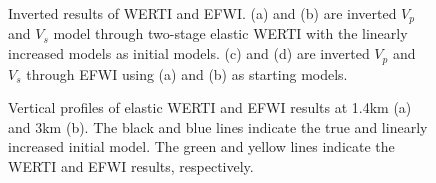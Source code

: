 \begin{figure}[!htb]
   \centering
   \caption{Inverted results of WERTI and EFWI. (a) and (b) are inverted $V_p$ and
       $V_s$ model through two-stage elastic WERTI with the linearly increased models
       as initial models. (c) and (d) are inverted $V_p$ and $V_s$ through EFWI using
   (a) and (b) as starting models.}
   \label{fig:E-WERTI+EFWI}
\end{figure}
\begin{figure}[!htb]
   \centering
   \caption{Vertical profiles of elastic WERTI and EFWI results at 1.4km (a) and
       3km (b). The black and blue lines indicate the true and linearly increased
       initial model. The green and yellow lines indicate the WERTI and EFWI results,
       respectively.
   }
   \label{fig:Profiles}
\end{figure}
